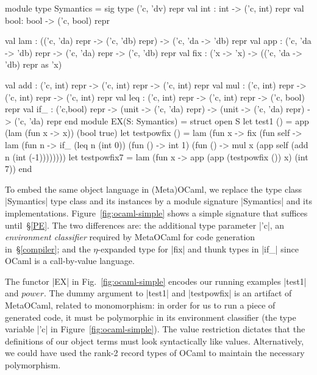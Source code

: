 \begin{figure*}[t]
\begin{floatrule}
\begin{code}
module type Symantics = sig type ('c, 'dv) repr
  val int : int  -> ('c, int) repr
  val bool: bool -> ('c, bool) repr

  val lam : (('c, 'da) repr -> ('c, 'db) repr) -> ('c, 'da -> 'db) repr
  val app : ('c, 'da -> 'db) repr -> ('c, 'da) repr -> ('c, 'db) repr
  val fix : ('x -> 'x) -> (('c, 'da -> 'db) repr as 'x)

  val add : ('c, int) repr -> ('c, int) repr -> ('c, int) repr
  val mul : ('c, int) repr -> ('c, int) repr -> ('c, int) repr
  val leq : ('c, int) repr -> ('c, int) repr -> ('c, bool) repr
  val if_ : ('c,bool) repr -> (unit -> ('c, 'da) repr)
                           -> (unit -> ('c, 'da) repr) -> ('c, 'da) repr
end
module EX(S: Symantics) = struct open S
  let test1 () = app (lam (fun x -> x)) (bool true)
  let testpowfix () =
       lam (fun x -> fix (fun self -> lam (fun n ->
        if_ (leq n (int 0)) (fun () -> int 1)
            (fun () -> mul x (app self (add n (int (-1))))))))
  let testpowfix7 =  lam (fun x -> app (app (testpowfix ()) x) (int 7))
end
\end{code}
\end{floatrule}
\caption{A simple (Meta)OCaml embedding of our object language}
\label{fig:ocaml-simple}
\end{figure*}
To embed the same object language in (Meta)OCaml, we replace the \ifshort type
class \fi |Symantics| \ifshort\else type class \fi and its instances by a module signature |Symantics|
and its implementations.  Figure~\ref{fig:ocaml-simple} shows a simple
signature that suffices until~\S\ref{PE}.  The two differences are:
the additional type parameter |'c|, an
\emph{environment classifier} \cite{WalidPOPL03} required by MetaOCaml for
code generation in~\S\ref{compiler}; and the $\eta$-expanded type for
|fix| and thunk types in |if_| since OCaml is a call-by-value
language.

The functor |EX| in Fig.~\ref{fig:ocaml-simple} encodes 
our running examples |test1| and $\mathit{power}$.
The dummy argument to |test1| and |testpowfix| is an artifact of
MetaOCaml, related to monomorphism: in order for us to run a
piece of generated code, it must be polymorphic in its environment
classifier (the type variable |'c| in Figure~\ref{fig:ocaml-simple}).
The value restriction dictates that
the definitions of our object terms must look syntactically like
values. Alternatively, we could have used
the rank-2 record types of OCaml to maintain the necessary polymorphism.

